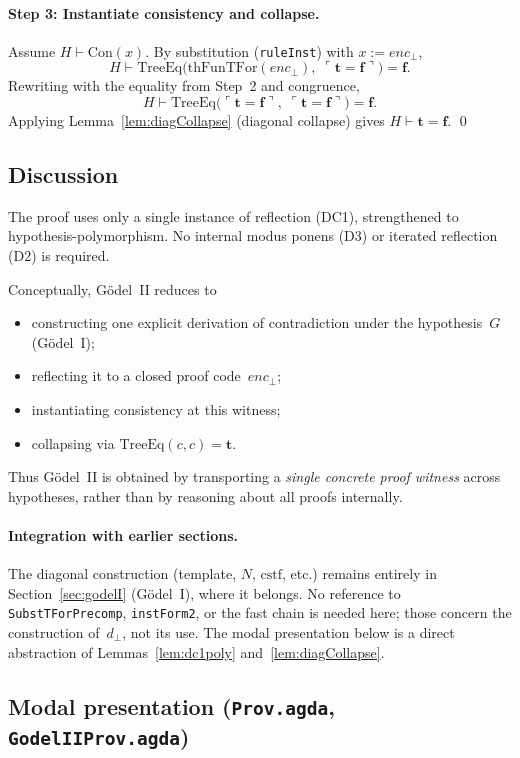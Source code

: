 \documentclass[11pt]{article}
\newcommand{\trueT}{\mathbf{t}}
\newcommand{\falseT}{\mathbf{f}}
\newcommand{\code}[1]{\ulcorner #1 \urcorner}
\newcommand{\thFunTFor}{\mathrm{thFunTFor}}
\newcommand{\TreeEq}{\mathrm{TreeEq}}
\begin{document}
\paragraph{Step 3: Instantiate consistency and collapse.}
Assume $H \vdash \mathrm{Con}(x)$.  By substitution
(\texttt{ruleInst}) with $x := \mathit{enc}_\bot$,
\[
  H \vdash \TreeEq\bigl(\thFunTFor(\mathit{enc}_\bot),\;\code{\trueT = \falseT}\bigr) = \falseT.
\]
Rewriting with the equality from Step~2 and congruence,
\[
  H \vdash \TreeEq\bigl(\code{\trueT = \falseT},\;\code{\trueT = \falseT}\bigr) = \falseT.
\]
Applying Lemma~\ref{lem:diagCollapse} (diagonal collapse) gives
$H \vdash \trueT = \falseT$. \qed

\subsection{Discussion}

The proof uses only a single instance of reflection (DC1),
strengthened to hypothesis-polymorphism.  No internal modus ponens
(D3) or iterated reflection (D2) is required.

Conceptually, G\"odel~II reduces to
\begin{itemize}
\item constructing one explicit derivation of contradiction
  under the hypothesis~$G$ (G\"odel~I);
\item reflecting it to a closed proof code~$\mathit{enc}_\bot$;
\item instantiating consistency at this witness;
\item collapsing via $\TreeEq(c, c) = \trueT$.
\end{itemize}
Thus G\"odel~II is obtained by transporting a \emph{single concrete
proof witness} across hypotheses, rather than by reasoning about
all proofs internally.

\paragraph{Integration with earlier sections.}
The diagonal construction (template, $N$, $\mathrm{cstf}$, etc.)
remains entirely in Section~\ref{sec:godelI} (G\"odel~I), where it
belongs.  No reference to \texttt{SubstTForPrecomp},
\texttt{instForm2}, or the fast chain is needed here; those
concern the construction of~$d_\bot$, not its use.  The modal
presentation below is a direct abstraction of
Lemmas~\ref{lem:dc1poly} and~\ref{lem:diagCollapse}.

\subsection{Modal presentation (\texttt{Prov.agda}, \texttt{GodelIIProv.agda})}
\end{document}
